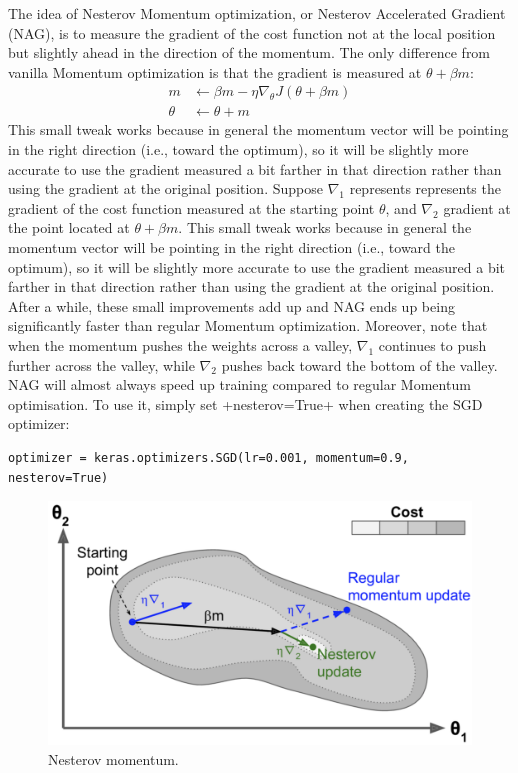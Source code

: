 The idea of Nesterov Momentum optimization, or Nesterov Accelerated Gradient (NAG), is to measure the gradient of the cost function not at the local position but slightly ahead in the direction of the momentum. The only difference from vanilla Momentum optimization is that the gradient is measured at $\theta + \beta m$:
\begin{equation}
\begin{aligned}
m &\leftarrow \beta m - \eta \nabla_\theta J(\theta+\beta m)\\
\theta &\leftarrow \theta + m
\end{aligned}
\end{equation}
This small tweak works because in general the momentum vector will be pointing in the right direction (i.e., toward the optimum), so it will be slightly more accurate to use the gradient measured a bit farther in that direction rather than using the gradient at the original position. Suppose $\nabla_1$ represents represents the gradient of the cost function measured at the starting point $\theta$, and $\nabla_2$ gradient at the point located at $\theta + \beta m$. This small tweak works because in general the momentum vector will be pointing in the right direction (i.e., toward the optimum), so it will be slightly more accurate to use the gradient measured a bit farther in that direction rather than using the gradient at the original position. After a while, these small improvements add up and NAG ends up being significantly faster than regular Momentum optimization. Moreover, note that when the momentum pushes the weights across a valley, $\nabla_1$ continues to push further across the valley, while $\nabla_2$ pushes back toward the bottom of the valley. NAG will almost always speed up training compared to regular Momentum optimisation. To use it, simply set \cd+nesterov=True+ when creating the SGD optimizer:
\begin{lstlisting}
optimizer = keras.optimizers.SGD(lr=0.001, momentum=0.9, nesterov=True)
\end{lstlisting}
\begin{figure}
\centering
\includegraphics[scale=0.5]{img/nesterov}
\caption{Nesterov momentum.}
\end{figure}
